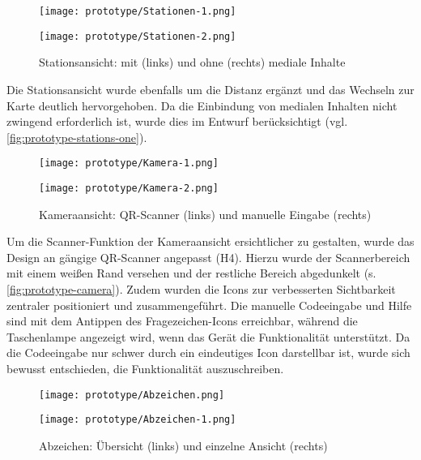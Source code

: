 \begin{figure}[htpb]
    \begin{minipage}{.5\textwidth}
        \centering
        \texttt{[image: prototype/Stationen-1.png]}
    \end{minipage}%
    \begin{minipage}{.5\textwidth}
        \centering
        \texttt{[image: prototype/Stationen-2.png]}
    \end{minipage}
    \caption{Stationsansicht: mit (links) und ohne (rechts) mediale Inhalte}
    \label{fig:prototype-stations-one}
\end{figure}

Die Stationsansicht wurde ebenfalls um die Distanz ergänzt und das
Wechseln zur Karte deutlich hervorgehoben. Da die Einbindung von medialen
Inhalten nicht zwingend erforderlich ist, wurde dies im Entwurf berücksichtigt
(vgl. \autoref{fig:prototype-stations-one}).

\begin{figure}[htpb]
    \begin{minipage}{.5\textwidth}
        \centering
        \texttt{[image: prototype/Kamera-1.png]}
    \end{minipage}%
    \begin{minipage}{.5\textwidth}
        \centering
        \texttt{[image: prototype/Kamera-2.png]}
    \end{minipage}
    \caption{Kameraansicht: QR-Scanner (links) und manuelle Eingabe (rechts)}
    \label{fig:prototype-camera}
\end{figure}

Um die Scanner-Funktion der Kameraansicht ersichtlicher zu gestalten, wurde das
Design an gängige QR-Scanner angepasst (H4). Hierzu wurde der Scannerbereich mit
einem weißen Rand versehen und der restliche Bereich abgedunkelt (s.
\autoref{fig:prototype-camera}). Zudem wurden die Icons zur verbesserten
Sichtbarkeit zentraler positioniert und zusammengeführt. Die manuelle
Codeeingabe und Hilfe sind mit dem Antippen des Fragezeichen-Icons erreichbar,
während die Taschenlampe angezeigt wird, wenn das Gerät die Funktionalität
unterstützt. Da die Codeeingabe nur schwer durch ein eindeutiges Icon
darstellbar ist, wurde sich bewusst entschieden, die Funktionalität auszuschreiben.

\begin{figure}[htpb]
    \begin{minipage}{.5\textwidth}
        \centering
        \texttt{[image: prototype/Abzeichen.png]}
    \end{minipage}%
    \begin{minipage}{.5\textwidth}
        \centering
        \texttt{[image: prototype/Abzeichen-1.png]}
    \end{minipage}
    \caption{Abzeichen: Übersicht (links) und einzelne Ansicht (rechts)}
    \label{fig:prototype-achievement}
\end{figure}

